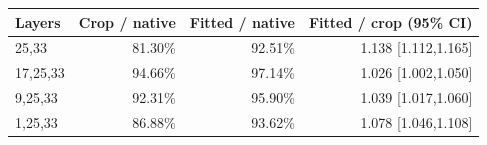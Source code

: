 \begin{tabular}{lrrr}
\toprule
Layers & Crop / native & Fitted / native & Fitted / crop (95\% CI) \\
\midrule
25,33 & 81.30\% & 92.51\% & 1.138 [1.112,1.165] \\
17,25,33 & 94.66\% & 97.14\% & 1.026 [1.002,1.050] \\
9,25,33 & 92.31\% & 95.90\% & 1.039 [1.017,1.060] \\
1,25,33 & 86.88\% & 93.62\% & 1.078 [1.046,1.108] \\
\bottomrule
\end{tabular}
